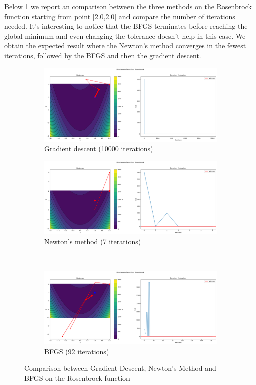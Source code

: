 Below \ref{fig:ros-comparison} we report an comparison between the three methods on the Rosenbrock function starting from point [2.0,2.0] and compare the number of iterations needed. It's interesting to notice that the BFGS terminates before reaching the global minimum and even changing the tolerance doesn't help in this case. We obtain the expected result where the Newton's method converges in the fewest iterations, followed by the BFGS and then the gradient descent.
\begin{figure}
    \begin{subfigure}{0.5\linewidth}
        \includegraphics[width=\linewidth]{lab3/imgs/gd_rosenbrock.png}
        \caption{Gradient descent (10000 iterations)}
    \end{subfigure}
    \begin{subfigure}{0.5\linewidth}
        \includegraphics[width=\linewidth]{lab3/imgs/nm_rosenbrock.png}
        \caption{Newton's method (7 iterations)}
    \end{subfigure} \\
    \begin{subfigure}{\linewidth}
        \centering
        \includegraphics[width=0.5\linewidth]{lab3/imgs/bfgs_rosenbrock.png}
        \caption{BFGS (92 iterations)}
    \end{subfigure}
    \caption{Comparison between Gradient Descent, Newton's Method and BFGS on the Rosenbrock function}
    \label{fig:ros-comparison}
\end{figure}